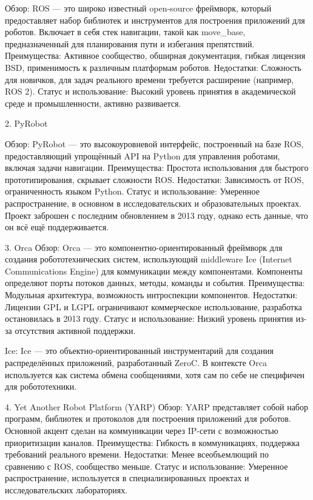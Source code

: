 Обзор: ROS — это широко известный open-source фреймворк, который
предоставляет набор библиотек и инструментов для построения приложений для
роботов. Включает в себя стек навигации, такой как move\_base,
предназначенный для планирования пути и избегания препятствий. Преимущества:
Активное сообщество, обширная документация, гибкая лицензия BSD,
применимость к различным платформам роботов. Недостатки: Сложность для
новичков, для задач реального времени требуется расширение (например, ROS
2). Статус и использование: Высокий уровень принятия в академической среде и
промышленности, активно развивается.

2. PyRobot

Обзор: PyRobot — это высокоуровневой интерфейс, построенный на базе ROS,
предоставляющий упрощённый API на Python для управления роботами, включая
задачи навигации. Преимущества: Простота использования для быстрого
прототипирования, скрывает сложности ROS. Недостатки: Зависимость от ROS,
ограниченность языком Python. Статус и использование: Умеренное
распространение, в основном в исследовательских и образовательных проектах.
Проект заброшен с последним обновлением в 2013 году, однако есть данные,
что он всё ещё поддерживается.

3. Orca
Обзор: Orca — это компонентно-ориентированный фреймворк для создания
робототехнических систем, использующий middleware Ice (Internet
Communications Engine) для коммуникации между компонентами. Компоненты
определяют порты потоков данных, методы, команды и события. Преимущества:
Модульная архитектура, возможность интроспекции компонентов. Недостатки:
Лицензии GPL и LGPL ограничивают коммерческое использование, разработка
остановилась в 2013 году. Статус и использование: Низкий уровень принятия
из-за отсутствия активной поддержки.

Ice: Ice — это объектно-ориентированный инструментарий для создания
распределённых приложений, разработанный ZeroC. В контексте Orca
используется как система обмена сообщениями, хотя сам по себе не специфичен
для робототехники. 

4. Yet Another Robot Platform (YARP)
Обзор: YARP представляет собой набор программ, библиотек и протоколов для
построения приложений для роботов. Основной акцент сделан на коммуникации
через IP-сети с возможностью приоритизации каналов. Преимущества: Гибкость в
коммуникациях, поддержка требований реального времени. Недостатки: Менее
всеобъемлющий по сравнению с ROS, сообщество меньше. Статус и использование:
Умеренное распространение, используется в специализированных проектах и
исследовательских лабораториях.

